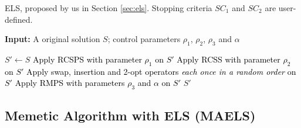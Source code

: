 \documentclass[journal]{IEEEtran}
\newcommand\rpj[1]{\textcolor{black}{#1}}
\newcommand\lwx[1]{\textcolor{magenta}{#1}}
\begin{document}
\begin{algorithm}[htbp]
	\caption{\label{local}ELS, proposed by us in Section \ref{sec:els}. Stopping criteria $SC_1$ and $SC_2$ are user-defined.}
	{\bf Input:}
	A original solution $S$; control parameters $\rho_1$, $\rho_2$, $\rho_3$ and $\alpha$
	\begin{algorithmic}[1]
		\State $S' \leftarrow S$
		\State \rpj{Apply RCSPS with parameter $\rho_1$ on $S'$}
		\State \rpj{Apply RCSS with parameter $\rho_2$ on $S'$}
		\State \rpj{Apply swap, insertion and 2-opt operators \emph{each once in a random order} on $S'$}
		\EndWhile
		\State \rpj{Apply RMPS with parameters $\rho_3$ and $\alpha$ on $S'$}
		\EndWhile
		\State \Return $S'$
	\end{algorithmic}
\end{algorithm}

\subsection{Memetic Algorithm with ELS (MAELS)}\label{sec:maels}
\end{document}
